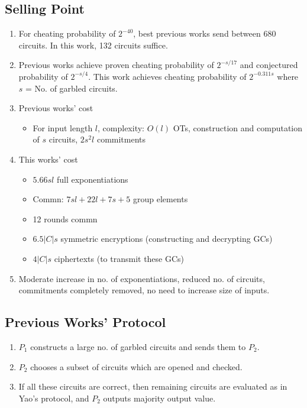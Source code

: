 \subsection{Selling Point}
\begin{enumerate}
    \item For cheating probability of $2^{-40}$, best previous works send between 680 circuits. In this work, 132 circuits suffice.
    \item Previous works achieve proven cheating probability of $2^{-s/17}$ and conjectured probability of $2^{-s/4}$. This work achieves cheating probability of $2^{-0.311s}$ where $s$ = No. of garbled circuits.
    \item Previous works' cost
    \begin{itemize}
        \item For input length $l$, complexity: $O(l)$ OTs, construction and computation of $s$ circuits, $2s^2l$ commitments
    \end{itemize}
    \item This works' cost
    \begin{itemize}
        \item $5.66sl$ full exponentiations
        \item Commn: $7sl + 22l + 7s + 5$ group elements
        \item 12 rounds commn
        \item $6.5|C|s$ symmetric encryptions (constructing and decrypting GCs)
        \item $4|C|s$ ciphertexts (to transmit these GCs)
    \end{itemize}
    \item Moderate increase in no. of exponentiations, reduced no. of circuits, commitments completely removed, no need to increase size of inputs.
\end{enumerate}

\subsection{Previous Works' Protocol}
\begin{enumerate}
    \item $P_1$ constructs a large no. of garbled circuits and sends them to $P_2$.
    \item $P_2$ chooses a subset of circuits which are opened and checked.
    \item If all these circuits are correct, then remaining circuits are evaluated as in Yao's protocol, and $P_2$ outputs majority output value.
\end{enumerate}

